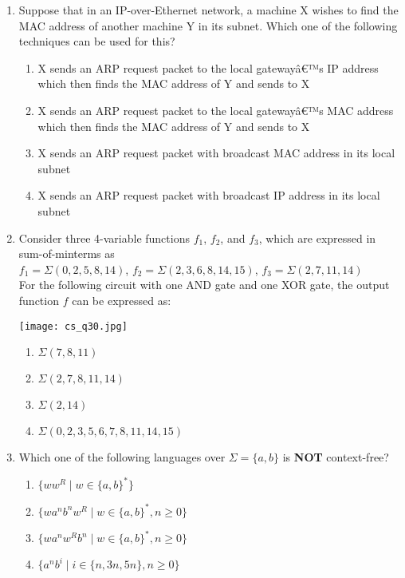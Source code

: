 \documentclass[12pt]{article}
\begin{document}
\begin{enumerate}[label=Q.\arabic*]
\item Suppose that in an IP-over-Ethernet network, a machine X wishes to find the MAC address of another machine Y in its subnet. Which one of the following techniques can be used for this?
\begin{enumerate}[label=(\Alph*)]
\item X sends an ARP request packet to the local gatewayâ€™s IP address which then finds the MAC address of Y and sends to X
\item X sends an ARP request packet to the local gatewayâ€™s MAC address which then finds the MAC address of Y and sends to X
\item X sends an ARP request packet with broadcast MAC address in its local subnet
\item X sends an ARP request packet with broadcast IP address in its local subnet
\end{enumerate}

\item Consider three 4-variable functions $f_1$, $f_2$, and $f_3$, which are expressed in sum-of-minterms as \\
$f_1 = \Sigma(0, 2, 5, 8, 14)$,\quad
$f_2 = \Sigma(2, 3, 6, 8, 14, 15)$,\quad
$f_3 = \Sigma(2, 7, 11, 14)$\\
For the following circuit with one AND gate and one XOR gate, the output function $f$ can be expressed as:

\begin{center}
\texttt{[image: cs\_q30.jpg]} 
\end{center}

\begin{enumerate}[label=(\Alph*)]
\item $\Sigma(7, 8, 11)$
\item $\Sigma(2, 7, 8, 11, 14)$
\item $\Sigma(2, 14)$
\item $\Sigma(0, 2, 3, 5, 6, 7, 8, 11, 14, 15)$
\end{enumerate}

\item Which one of the following languages over $\Sigma = \{a, b\}$ is \textbf{NOT} context-free?
\begin{enumerate}[label=(\Alph*)]
  \item $\{ ww^R \mid w \in \{a, b\}^* \}$
  \item $\{ wa^n b^n w^R \mid w \in \{a, b\}^*, n \geq 0 \}$
  \item $\{ wa^n w^R b^n \mid w \in \{a, b\}^*, n \geq 0 \}$
  \item $\{ a^n b^i \mid i \in \{n, 3n, 5n\}, n \geq 0 \}$
\end{enumerate}


\end{enumerate}
\end{document}
